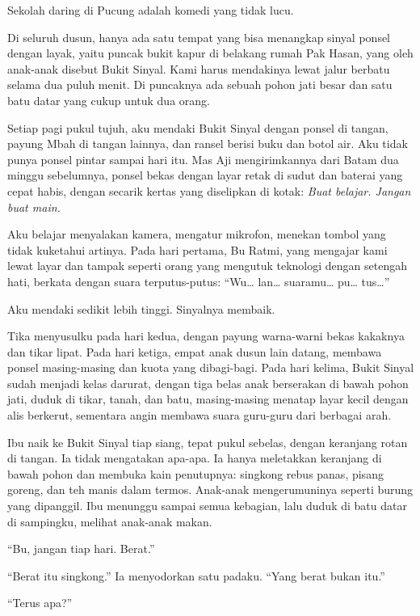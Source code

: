 \documentclass[11pt,twoside,openany]{book}
\makeatletter
\newcommand{\scenebreak}{\par\vspace{0.9em}{\centering\textsc{*\hspace{0.7em}*\hspace{0.7em}*}\par}\vspace{0.9em}\@afterindentfalse\@afterheading}
\makeatother
\begin{document}
\scenebreak
Sekolah daring di Pucung adalah komedi yang tidak lucu.

Di seluruh dusun, hanya ada satu tempat yang bisa menangkap sinyal ponsel dengan layak, yaitu puncak bukit kapur di belakang rumah Pak Hasan, yang oleh anak-anak disebut Bukit Sinyal. Kami harus mendakinya lewat jalur berbatu selama dua puluh menit. Di puncaknya ada sebuah pohon jati besar dan satu batu datar yang cukup untuk dua orang.

Setiap pagi pukul tujuh, aku mendaki Bukit Sinyal dengan ponsel di tangan, payung Mbah di tangan lainnya, dan ransel berisi buku dan botol air. Aku tidak punya ponsel pintar sampai hari itu. Mas Aji mengirimkannya dari Batam dua minggu sebelumnya, ponsel bekas dengan layar retak di sudut dan baterai yang cepat habis, dengan secarik kertas yang diselipkan di kotak: \emph{Buat belajar. Jangan buat main.}

Aku belajar menyalakan kamera, mengatur mikrofon, menekan tombol yang tidak kuketahui artinya. Pada hari pertama, Bu Ratmi, yang mengajar kami lewat layar dan tampak seperti orang yang mengutuk teknologi dengan setengah hati, berkata dengan suara terputus-putus: ``Wu\ldots{} lan\ldots{} suaramu\ldots{} pu\ldots{} tus\ldots{}''

Aku mendaki sedikit lebih tinggi. Sinyalnya membaik.

Tika menyusulku pada hari kedua, dengan payung warna-warni bekas kakaknya dan tikar lipat. Pada hari ketiga, empat anak dusun lain datang, membawa ponsel masing-masing dan kuota yang dibagi-bagi. Pada hari kelima, Bukit Sinyal sudah menjadi kelas darurat, dengan tiga belas anak berserakan di bawah pohon jati, duduk di tikar, tanah, dan batu, masing-masing menatap layar kecil dengan alis berkerut, sementara angin membawa suara guru-guru dari berbagai arah.

Ibu naik ke Bukit Sinyal tiap siang, tepat pukul sebelas, dengan keranjang rotan di tangan. Ia tidak mengatakan apa-apa. Ia hanya meletakkan keranjang di bawah pohon dan membuka kain penutupnya: singkong rebus panas, pisang goreng, dan teh manis dalam termos. Anak-anak mengerumuninya seperti burung yang dipanggil. Ibu menunggu sampai semua kebagian, lalu duduk di batu datar di sampingku, melihat anak-anak makan.

``Bu, jangan tiap hari. Berat.''

``Berat itu singkong.'' Ia menyodorkan satu padaku. ``Yang berat bukan itu.''

``Terus apa?''
\end{document}
